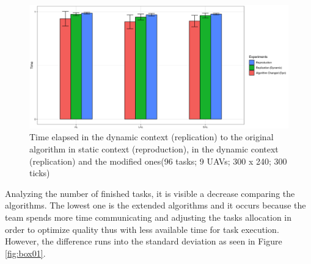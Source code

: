 \begin{figure}[h!]
	\begin{center}
		\includegraphics[scale=0.15]{fig/din3.png}
		\caption{Time elapsed in the dynamic context (replication) to the original algorithm in static context (reproduction), in the dynamic context (replication) and the modified ones(96 tasks; 9 UAVs; 300 x 240; 300 ticks)}
		\label{fig:din02}
	\end{center}
\end{figure}

Analyzing the number of finished tasks, it is visible a decrease comparing the algorithms. The lowest one is the extended algorithms and it occurs because the team spends more time communicating and adjusting the tasks allocation in order to optimize quality thus with less available time for task execution. However, the difference runs into the standard deviation as seen in Figure \ref{fig:box01}.


